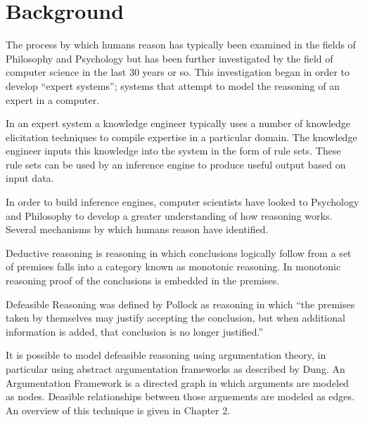 
\section{Background}

The process by which humans reason has typically been examined in the fields of Philosophy and Psychology but has been further investigated by the field of computer science in the last 30 years or so. This investigation began in order to develop ``expert systems''; systems that attempt to model the reasoning of an expert in a computer.

In an expert system a knowledge engineer typically uses a number of knowledge elicitation techniques to compile expertise in a particular domain. The knowledge engineer inputs this knowledge into the system in the form of rule sets. These rule sets can be used by an inference engine to produce useful output based on input data. 

In order to build inference engines, computer scientists have looked to Psychology and Philosophy to develop a greater understanding of how reasoning works. Several mechanisms by which humans reason have identified.

Deductive reasoning is reasoning in which conclusions logically follow from a set of premises falls into a category known as monotonic reasoning. In monotonic reasoning proof of the conclusions is embedded in the premises.

Defeasible Reasoning was defined by Pollock as reasoning in which ``the premises taken by themselves may justify accepting the conclusion, but when additional information is added, that conclusion is no longer justified.''\cite{pollock1987defeasible}

It is possible to model defeasible reasoning using argumentation theory, in particular using abstract argumentation frameworks as described by Dung.\cite{dung1995acceptability} An Argumentation Framework is a directed graph in which arguments are modeled as nodes. Deasible relationships between those arguements are modeled as edges. An overview of this technique is given in Chapter 2.

